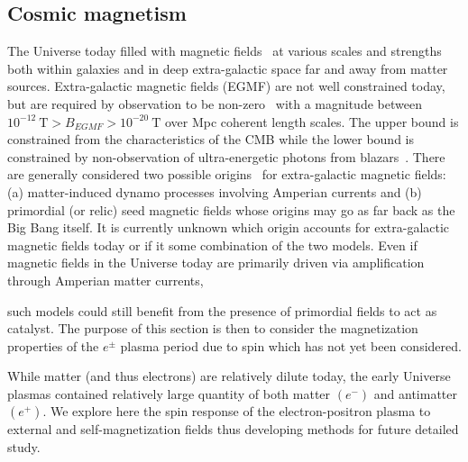 \documentclass[universe,article,submit,moreauthors,pdftex,a4paper]{Definitions/mdpi}
\newcommand*{\xblue}{\color{black}}
\begin{document}
\subsection{Cosmic magnetism}\label{sec:Energy}
\noindent The Universe today filled with magnetic fields~\cite{Kronberg:1993vk} at various scales and strengths both within galaxies and in deep extra-galactic space far and away from matter sources. Extra-galactic magnetic fields (EGMF) are not well constrained today, but are required by observation to be non-zero~\cite{Anchordoqui:2001bs,Widrow:2002ud} with a magnitude between $10^{-12}\ \mathrm{T}>B_{EGMF}>10^{-20}\ \mathrm{T}$ over Mpc coherent length scales. The upper bound is constrained from the characteristics of the CMB while the lower bound is constrained by non-observation of ultra-energetic photons from blazars~\cite{Neronov:2010gir}. There are generally considered two possible origins~\cite{Widrow:2011hs,Vazza:2021vwy} for extra-galactic magnetic fields: (a) matter-induced dynamo processes involving Amperian currents and (b) primordial (or relic) seed magnetic fields whose origins may go as far back as the Big Bang itself. It is currently unknown which origin accounts for extra-galactic magnetic fields today or if it some combination of the two models. Even if magnetic fields in the Universe today are primarily driven via amplification through Amperian matter currents, {\xblue such models could still benefit from the presence of primordial fields to act as catalyst. The purpose of this section is then to consider the magnetization properties of the $e^{\pm}$ plasma period due to spin which has not yet been considered. 

While matter (and thus electrons) are relatively dilute today, the early Universe plasmas contained relatively large quantity of both matter $(e^-)$ and antimatter $(e^+)$. We explore here the spin response of the electron-positron plasma to external and self-magnetization fields thus developing methods for future detailed study.}
\end{document}
